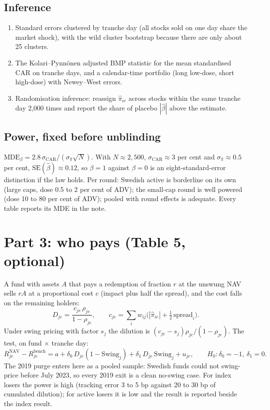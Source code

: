 \documentclass[11pt,a4paper]{article}
\newcommand{\CAR}{\mathrm{CAR}}
\begin{document}
\subsection{Inference}
\begin{enumerate}[nosep]
\item Standard errors clustered by tranche day (all stocks sold on one day share the market shock), with the wild cluster bootstrap because there are only about 25 clusters.
\item The Kolari--Pynnönen adjusted BMP statistic for the mean standardised $\CAR$ on tranche days, and a calendar-time portfolio (long low-dose, short high-dose) with Newey--West errors.
\item Randomisation inference: reassign $\hat\pi_{ie}$ across stocks within the same tranche day 2,000 times and report the share of placebo $|\hat\beta|$ above the estimate.
\end{enumerate}

\subsection{Power, fixed before unblinding}
$\text{MDE}_\beta = 2.8\,\sigma_{\CAR}/(\sigma_{\hat\pi}\sqrt N)$. With $N\approx 2{,}500$, $\sigma_{\CAR}\approx 3$ per cent and $\sigma_{\hat\pi}\approx 0.5$ per cent, $\text{SE}(\hat\beta)\approx 0.12$, so $\beta=1$ against $\beta=0$ is an eight-standard-error distinction if the law holds. Per round: Swedish active is borderline on its own (large caps, dose 0.5 to 2 per cent of ADV); the small-cap round is well powered (dose 10 to 80 per cent of ADV); pooled with round effects is adequate. Every table reports its MDE in the note.

\section{Part 3: who pays (Table 5, optional)}
A fund with assets $A$ that pays a redemption of fraction $r$ at the unswung NAV sells $rA$ at a proportional cost $c$ (impact plus half the spread), and the cost falls on the remaining holders:
\begin{equation}
D_{je} = \frac{c_{je}\,\rho_{je}}{1-\rho_{je}}, \qquad c_{je} = \sum_i w_{ij}\big(|\hat\pi_{ie}| + \tfrac12\,\text{spread}_i\big).
\end{equation}
Under swing pricing with factor $s_j$ the dilution is $(c_{je}-s_j)\rho_{je}/(1-\rho_{je})$. The test, on fund $\times$ tranche day:
\begin{equation}
R^{\text{NAV}}_{je} - R^{\text{bench}}_{je} = a + \delta_0\, D_{je}(1-\text{Swing}_j) + \delta_1\, D_{je}\,\text{Swing}_j + u_{je}, \qquad H_0: \delta_0 = -1,\ \delta_1 = 0.
\end{equation}
The 2019 purge enters here as a pooled sample: Swedish funds could not swing-price before July 2023, so every 2019 exit is a clean no-swing case. For index losers the power is high (tracking error 3 to 5 bp against 20 to 30 bp of cumulated dilution); for active losers it is low and the result is reported beside the index result.
\end{document}
